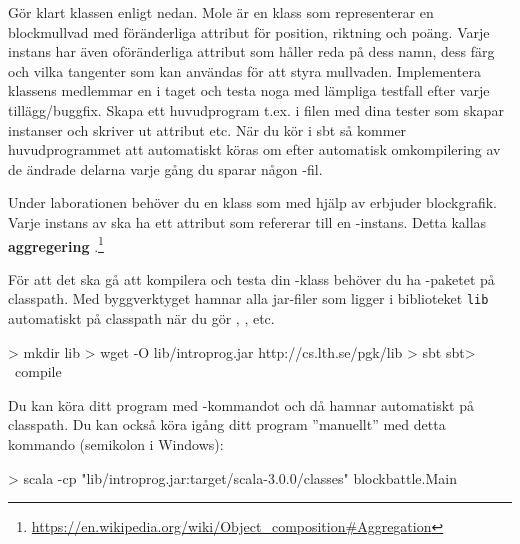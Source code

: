 \Subtask Gör klart klassen  enligt nedan. Mole är en klass som representerar en blockmullvad med föränderliga attribut för position, riktning och poäng. Varje instans har även oföränderliga attribut som håller reda på dess namn, dess färg och vilka tangenter som kan användas för att styra mullvaden. Implementera klassens medlemmar en i taget och testa noga med lämpliga testfall efter varje tillägg/buggfix. Skapa ett huvudprogram t.ex. i filen  med dina tester som skapar instanser och skriver ut attribut etc. När du kör  i sbt så kommer huvudprogrammet att automatiskt köras om efter automatisk omkompilering av de ändrade delarna varje gång du sparar någon -fil.
%
%
%
%
%



\Subtask Under laborationen behöver du en klass  som med hjälp av  erbjuder blockgrafik. Varje instans av  ska ha ett attribut som refererar till en -instans. Detta kallas \textbf{aggregering} .\footnote{\url{https://en.wikipedia.org/wiki/Object\_composition\#Aggregation}}

För att det ska gå att kompilera och testa din -klass behöver du ha -paketet på classpath. Med byggverktyget  hamnar alla jar-filer som ligger i biblioteket \texttt{lib} automatiskt på classpath när du gör , , etc.

\begin{REPLnonum}
> mkdir lib
> wget -O lib/introprog.jar http://cs.lth.se/pgk/lib
> sbt
sbt> ~compile
\end{REPLnonum}
Du kan köra ditt program med -kommandot  och då hamnar  automatiskt på classpath. Du kan också köra igång ditt program ''manuellt'' med detta kommando (semikolon i Windows):
\begin{REPLnonum}
> scala -cp "lib/introprog.jar:target/scala-3.0.0/classes" blockbattle.Main
\end{REPLnonum}

